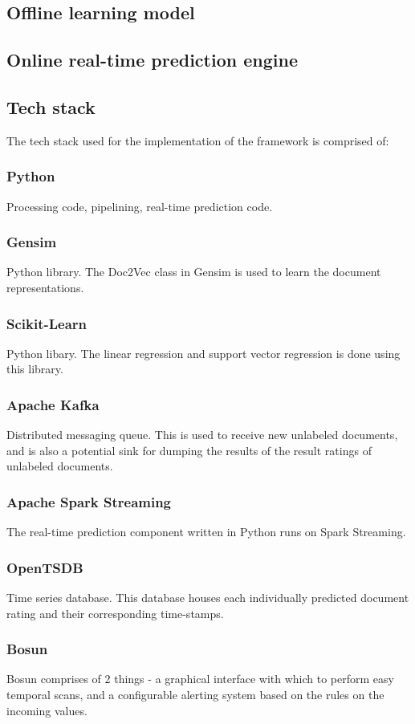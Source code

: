 \documentclass[conference]{IEEEtran}
\begin{document}
\subsection{Offline learning model}

\subsection{Online real-time prediction engine}

\subsection{Tech stack}
The tech stack used for the implementation of the framework is comprised of:

\subsubsection{Python}
Processing code, pipelining, real-time prediction code.
\subsubsection{Gensim}
Python library. The Doc2Vec class in Gensim is used to learn the document representations.
\subsubsection{Scikit-Learn}
Python libary. The linear regression and support vector regression is done using this library.
\subsubsection{Apache Kafka}
Distributed messaging queue. This is used to receive new unlabeled documents, and is also a potential sink for dumping the results of the result ratings of unlabeled documents.
\subsubsection{Apache Spark Streaming}
The real-time prediction component written in Python runs on Spark Streaming.
\subsubsection{OpenTSDB}
Time series database. This database houses each individually predicted document rating and their corresponding time-stamps.
\subsubsection{Bosun}
Bosun comprises of 2 things - a graphical interface with which to perform easy temporal scans, and a configurable alerting system based on the rules on the incoming values.
\end{document}

